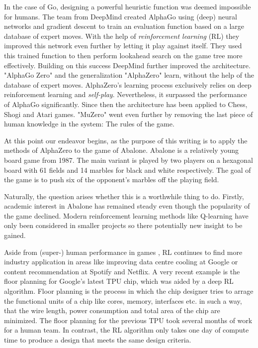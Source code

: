 In the case of Go, designing a powerful heuristic function was deemed impossible for humans. The team from DeepMind created AlphaGo using (deep) neural networks and gradient descent to train an evaluation function based on a large database of expert moves. With the help of \textit{reinforcement learning} (RL) they improved this network even further by letting it play against itself. They used this trained function to then perform lookahead search on the game tree more effectively. \cite{silver_mastering_2017} Building on this success DeepMind further improved the architecture. "AlphaGo Zero" and the generalization "AlphaZero" learn, without the help of the database of expert moves. AlphaZero's learning process exclusively relies on deep reinforcement learning and \textit{self-play}. Nevertheless, it surpassed the performance of AlphaGo significantly. Since then the architecture has been applied to Chess, Shogi and Atari games. "MuZero" went even further by removing the last piece of human knowledge in the system: The rules of the game. \cite{schrittwieser_mastering_2020}

At this point our endeavor begins, as the purpose of this writing is to apply the methods of AlphaZero to the game of Abalone. Abalone is a relatively young board game from 1987. The main variant is played by two players on a hexagonal board with 61 fields and 14 marbles for black and white respectively. The goal of the game is to push six of the opponent's marbles off the playing field.

Naturally, the question arises whether this is a worthwhile thing to do. Firstly, academic interest in Abalone has remained steady even though the popularity of the game declined. Modern reinforcement learning methods like Q-learning have only been considered in smaller projects \cite{mizrachi_introduction_2017} so there potentially new insight to be gained.

Aside from (super-) human performance in games \cite{mnih_human-level_2015, berner_dota_2019,vinyals_grandmaster_2019}, RL continues to find more industry application in areas like improving data centre cooling at Google \cite{gamble_safety-first_2018} or content recommendation at Spotify \cite{jebara_for_2020} and Netflix. \cite{siddiqi_ml_2019}
A very recent example is the floor planning for Google's latest TPU chip, which was aided by a deep RL algorithm. Floor planning is the process in which the chip designer tries to arrage the functional units of a chip like cores, memory, interfaces etc. in such a way, that the wire length, power consumption and total area of the chip are minimized. The floor planning for the previous TPU took several months of work for a human team. In contrast, the RL algorithm only takes one day of compute time to produce a design that meets the same design criteria. \cite{mirhoseini_graph_2021}

